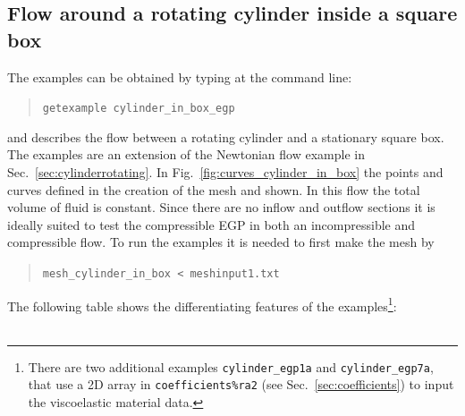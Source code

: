 \subsection{Flow around a rotating cylinder inside a square box}
\label{sec:cylinderegp}
The examples can be obtained by typing at the command line:
\begin{quote}
   \texttt{getexample cylinder\_in\_box\_egp}
\end{quote}
and describes the flow
between a rotating cylinder and a stationary square box. The examples are an extension of the Newtonian flow example in Sec.~\ref{sec:cylinderrotating}.
In Fig.~\ref{fig:curves_cylinder_in_box} the points and curves defined in the creation of the mesh and shown. In this flow the total volume of fluid is constant. Since there are no inflow and outflow sections it is ideally suited to test the compressible EGP in both an incompressible and compressible flow. To run the examples it is needed to first make the mesh by
\begin{quote}
   \texttt{mesh\_cylinder\_in\_box < meshinput1.txt}
\end{quote}
The following table shows the differentiating features of the examples\footnote{There are two additional examples
\texttt{cylinder\_egp1a} and \texttt{cylinder\_egp7a}, that use a 2D array in \texttt{coefficients\%ra2} (see Sec.~\ref{sec:coefficients}) to input the viscoelastic material data.}:\medskip\\
\medskip\\
